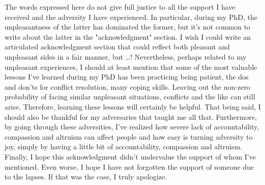 The words expressed here do not give full justice to all the support I have received and the adversity I have experienced.
In particular, during my PhD, the unpleasantness of the latter has dominated the former,
but it's not common to write about the latter in the "acknowledgment" section.
I wish I could write an articulated acknowledgment section that could reflect both pleasant and unpleasant sides in a fair manner,
but \dots!
Nevertheless,
perhaps related to my unpleasant experiences, I should at least mention that
some of the most valuable lessons I've learned during my PhD has been practicing being patient,
the dos and don'ts for conflict resolution, many coping skills.
Leaving out the non-zero probability of facing similar unpleasant situations,
conflicts and the like can still arise.
Therefore, learning these lessons will certainly be helpful.
That being said,
I should also be thankful for my adversaries that taught me all that.
Furthermore, by going through these adversities, I've realized  how severe lack of accountability, compassion and altruism can affect people and how easy is turning adversity to joy,
simply by having a little bit of accountability, compassion and altruism.
Finally, I hope this acknowledgment didn't undervalue the support of whom I've mentioned.
Even worse, I hope I have not forgotten the support of someone due to the lapses.
If that was the case, I truly apologize.

\endgroup


